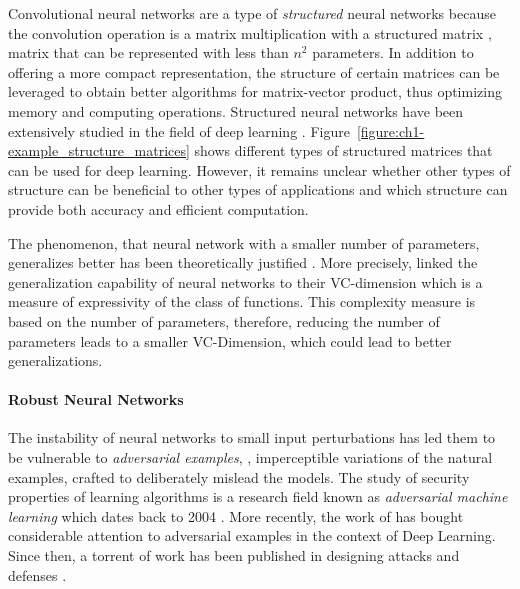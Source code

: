 Convolutional neural networks are a type of \emph{structured} neural networks because the convolution operation is a matrix multiplication with a structured matrix \ie, matrix that can be represented with less than $n^2$ parameters. 
In addition to offering a more compact representation, the structure of certain matrices can be leveraged to obtain better algorithms for matrix-vector product, thus optimizing memory and computing operations. 
Structured neural networks have been extensively studied in the field of deep learning \cite{moczulski2016acdc,sindhwani2015structured,denil2013predicting}.
Figure~\ref{figure:ch1-example_structure_matrices} shows different types of structured matrices that can be used for deep learning.
However, it remains unclear whether other types of structure can be beneficial to other types of applications and which structure can provide both accuracy and efficient computation.

The phenomenon, that neural network with a smaller number of parameters, generalizes better has been theoretically justified \cite{vapnik1982estimation}.
More precisely, \citeauthor{vapnik1982estimation} linked the generalization capability of neural networks to their VC-dimension which is a measure of expressivity of the class of functions.
This complexity measure is based on the number of parameters, therefore, reducing the number of parameters leads to a smaller VC-Dimension, which could lead to better generalizations.



\paragraph{Robust Neural Networks}

The instability of neural networks to small input perturbations has led them to be vulnerable to \emph{adversarial examples}, \ie, imperceptible variations of the natural examples, crafted to deliberately mislead the models.
The study of security properties of learning algorithms is a research field known as \emph{adversarial machine learning} which dates back to 2004 \cite{dalvi2004adversarial}.
More recently, the work of \citet{szegedy2013intriguing} has bought considerable attention to adversarial examples in the context of Deep Learning.
Since then, a torrent of work has been published in designing attacks and defenses \cite{szegedy2013intriguing,goodfellow2014explaining,papernot2016limitations,madry2018towards,carlini2017towards,pinot2019theoretical}.


